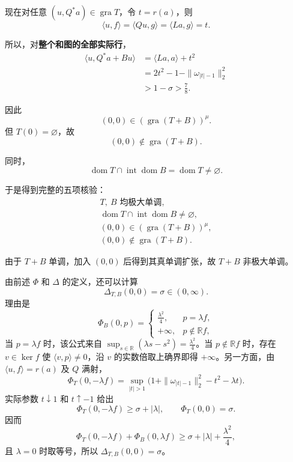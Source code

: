 \documentclass[UTF8,fontset=fandol,11pt,a4paper]{ctexart}
\begin{document}
现在对任意 $(u,Q^*a)\in\operatorname{gra}T$，令 $t=r(a)$，则 \[
\langle u,f\rangle
=\langle Qu,g\rangle
=\langle La,g\rangle=t.
\]

所以，对\textbf{整个和图的全部实际行}， \[
\begin{aligned}
\langle u,Q^*a+Bu\rangle
&=\langle La,a\rangle+t^2\\
&=2t^2-1-\|\omega_{|t|-1}\|_2^2\\
&>1-\sigma>\frac78.
\end{aligned}
\tag{29}
\]

因此 \[
(0,0)\in(\operatorname{gra}(T+B))^\mu.
\] 但 $T(0)=\varnothing$，故 \[
(0,0)\notin\operatorname{gra}(T+B).
\]

同时， \[
\operatorname{dom}T\cap\operatorname{int}\operatorname{dom}B
=\operatorname{dom}T\ne\varnothing.
\]

于是得到完整的五项核验： \[
\boxed{
\begin{gathered}
T,\ B\text{ 均极大单调},\\
\operatorname{dom}T\cap\operatorname{int}\operatorname{dom}B\ne\varnothing,\\
(0,0)\in(\operatorname{gra}(T+B))^\mu,\\
(0,0)\notin\operatorname{gra}(T+B).
\end{gathered}}
\tag{30}
\]

由于 $T+B$ 单调，加入 $(0,0)$ 后得到其真单调扩张，故 $T+B$ 非极大单调。

由前述 $\Phi$ 和 $\Delta$ 的定义，还可以计算 \[
\boxed{\Delta_{T,B}(0,0)=\sigma\in(0,\infty).}
\] 理由是 \[
\Phi_B(0,p)=
\begin{cases}
\frac{\lambda^2}{4},&p=\lambda f,\\
+\infty,&p\notin\mathbb Rf,
\end{cases}
\] 当 $p=\lambda f$ 时，该公式来自 $\sup_{s\in\mathbb R}(\lambda s-s^2)=\frac{\lambda^2}{4}$。当 $p\notin\mathbb Rf$ 时，存在 $v\in\ker f$ 使 $\langle v,p\rangle\ne0$，沿 $v$ 的实数倍取上确界即得 $+\infty$。另一方面，由 $\langle u,f\rangle=r(a)$ 及 $Q$ 满射，
\[
\Phi_T(0,-\lambda f)
=\sup_{|t|>1}\bigl(1+\|\omega_{|t|-1}\|_2^2-t^2-\lambda t\bigr).
\]
实际参数 $t\downarrow1$ 和 $t\uparrow-1$ 给出 \[
\Phi_T(0,-\lambda f)\ge\sigma+|\lambda|,
\qquad
\Phi_T(0,0)=\sigma.
\] 因而
\[
\Phi_T(0,-\lambda f)+\Phi_B(0,\lambda f)
\ge\sigma+|\lambda|+\frac{\lambda^2}{4},
\]
且 $\lambda=0$ 时取等号，所以 $\Delta_{T,B}(0,0)=\sigma$。
\end{document}
